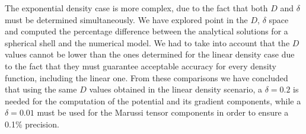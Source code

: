 \documentclass[extra]{gji}
\begin{document}
The exponential density case is more complex, due to the fact that both $D$ 
and $\delta$ must be determined simultaneously.
We have explored point in the $D$, $\delta$ space and computed the percentage 
difference between the analytical solutions for a spherical shell and the 
numerical model.
We had to take into account that the $D$ values cannot be lower than the ones 
determined for the linear density case due to the fact that they must 
guarantee acceptable accuracy for every density function, including the linear 
one.
From these comparisons we have concluded that using the same $D$ values 
obtained in the linear density scenario, a $\delta = 0.2$ is needed for the 
computation of the potential and its gradient components, while a $\delta = 
0.01$ must be used for the Marussi tensor components in order to ensure a 
0.1\% precision.




\end{document}
